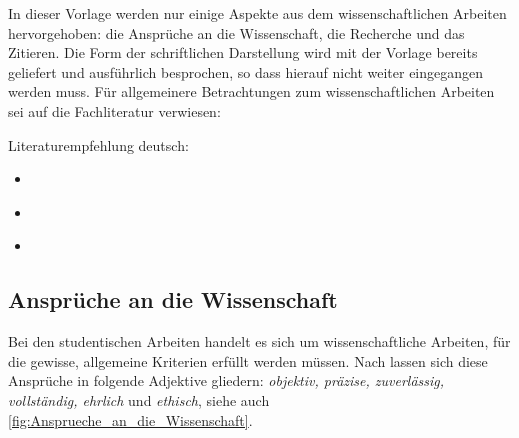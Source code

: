 In dieser Vorlage werden nur einige Aspekte aus dem wissenschaftlichen Arbeiten hervorgehoben: die Ansprüche an die Wissenschaft, die Recherche und das Zitieren. Die Form der schriftlichen Darstellung wird mit der Vorlage bereits geliefert und ausführlich besprochen, so dass hierauf nicht weiter eingegangen werden muss. Für allgemeinere Betrachtungen zum wissenschaftlichen Arbeiten sei auf die Fachliteratur verwiesen:

Literaturempfehlung deutsch:

\begin{itemize}
    \item \cite{Voss}
    \item \cite{Sesink}
    \item \cite{Karmasin}
\end{itemize}

\subsection{Ansprüche an die Wissenschaft}
\label{sec:AnspruecheWissenschaft}

Bei den studentischen Arbeiten handelt es sich um wissenschaftliche Arbeiten, für die gewisse, allgemeine Kriterien erfüllt werden müssen. Nach \cite{Voss} lassen sich diese Ansprüche in folgende Adjektive gliedern: \textit{objektiv, präzise, zuverlässig, vollständig, ehrlich} und \textit{ethisch}, siehe auch \cref{fig:Ansprueche_an_die_Wissenschaft}.

\begin{figure}%
\end{figure}

